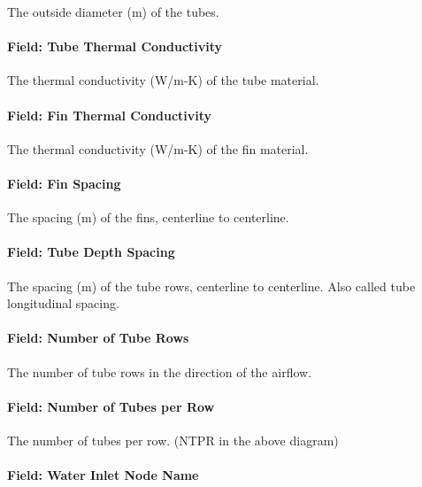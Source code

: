 The outside diameter (m) of the tubes.

\paragraph{Field: Tube Thermal Conductivity}\label{field-tube-thermal-conductivity}

The thermal conductivity (W/m-K) of the tube material.

\paragraph{Field: Fin Thermal Conductivity}\label{field-fin-thermal-conductivity}

The thermal conductivity (W/m-K) of the fin material.

\paragraph{Field: Fin Spacing}\label{field-fin-spacing}

The spacing (m) of the fins, centerline to centerline.

\paragraph{Field: Tube Depth Spacing}\label{field-tube-depth-spacing}

The spacing (m) of the tube rows, centerline to centerline. Also called tube longitudinal spacing.

\paragraph{Field: Number of Tube Rows}\label{field-number-of-tube-rows}

The number of tube rows in the direction of the airflow.

\paragraph{Field: Number of Tubes per Row}\label{field-number-of-tubes-per-row}

The number of tubes per row. (NTPR in the above diagram)

\paragraph{Field: Water Inlet Node Name}\label{field-water-inlet-node-name-3-000}

